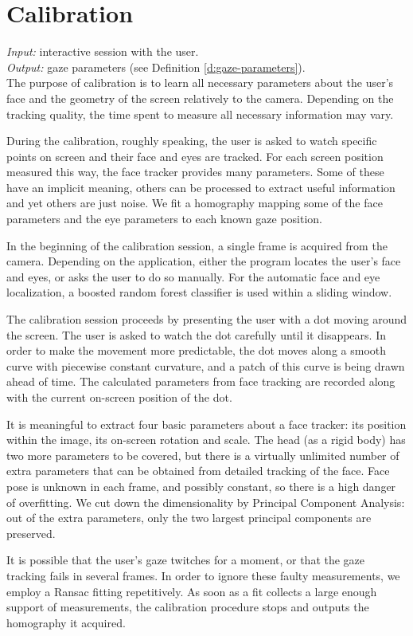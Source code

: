\section{Calibration}

\textit{Input:} interactive session with the user.\\
\textit{Output:} gaze parameters (see Definition \ref{d:gaze-parameters}).\\

The purpose of calibration is to learn all necessary parameters about the user's face and the geometry of the screen relatively to the camera.
Depending on the tracking quality, the time spent to measure all necessary information may vary.

During the calibration, roughly speaking, the user is asked to watch specific points on screen and their face and eyes are tracked.
For each screen position measured this way, the face tracker provides many parameters.
Some of these have an implicit meaning, others can be processed to extract useful information and yet others are just noise.
We fit a homography mapping some of the face parameters and the eye parameters to each known gaze position.

In the beginning of the calibration session, a single frame is acquired from the camera.
Depending on the application, either the program locates the user's face and eyes, or asks the user to do so manually.
For the automatic face and eye localization, a boosted random forest classifier is used within a sliding window.

The calibration session proceeds by presenting the user with a dot moving around the screen.
The user is asked to watch the dot carefully until it disappears.
In order to make the movement more predictable, the dot moves along a smooth curve with piecewise constant curvature, and a patch of this curve is being drawn ahead of time.
The calculated parameters from face tracking are recorded along with the current on-screen position of the dot.

It is meaningful to extract four basic parameters about a face tracker: its position within the image, its on-screen rotation and scale.
The head (as a rigid body) has two more parameters to be covered, but there is a virtually unlimited number of extra parameters that can be obtained from detailed tracking of the face.
Face pose is unknown in each frame, and possibly constant, so there is a high danger of overfitting.
We cut down the dimensionality by Principal Component Analysis: out of the extra parameters, only the two largest principal components are preserved.

It is possible that the user's gaze twitches for a moment, or that the gaze tracking fails in several frames.
In order to ignore these faulty measurements, we employ a Ransac fitting repetitively.
As soon as a fit collects a large enough support of measurements, the calibration procedure stops and outputs the homography it acquired.

